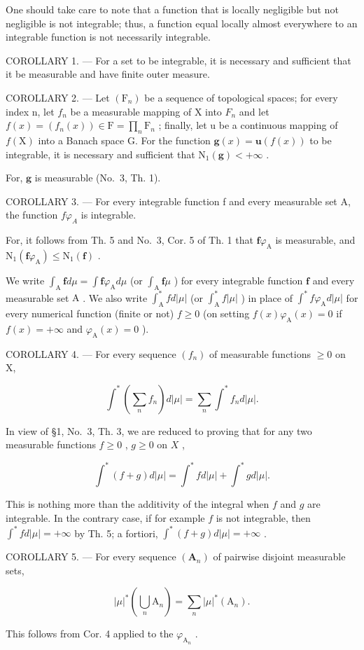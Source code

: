 One should take care to note that a function that is locally negligible but not negligible is not integrable; thus, a function equal locally almost everywhere to an integrable function is not necessarily integrable.

COROLLARY 1. --- For a set to be integrable, it is necessary and sufficient that it be measurable and have finite outer measure.

COROLLARY 2. --- Let \((\mathrm{F}_{n})\) be a sequence of topological spaces; for every index n, let \(f_{n}\) be a measurable mapping of X into \(F_{n}\) and let \(f(x) = (f_{n}(x)) \in \mathrm{F} = \prod_{n} \mathrm{F}_{n}\) ; finally, let u be a continuous mapping of \(f(\mathrm{X})\) into a Banach space G. For the function \(\mathbf{g}(x) = \mathbf{u}(f(x))\) to be integrable, it is necessary and sufficient that \(\mathrm{N}_{1}(\mathbf{g}) < +\infty\) .

For, \(\mathbf{g}\) is measurable (No.~3, Th. 1).

COROLLARY 3. --- For every integrable function f and every measurable set A, the function \(f\varphi_{A}\) is integrable.

For, it follows from Th. 5 and No.~3, Cor. 5 of Th. 1 that \(\mathbf{f}\varphi_{\mathrm{A}}\) is measurable, and \(\mathrm{N}_1(\mathbf{f}\varphi_{\mathrm{A}}) \leqslant \mathrm{N}_1(\mathbf{f})\) .

We write \(\int_{\mathrm{A}} \mathbf{f} d\mu = \int \mathbf{f} \varphi_{\mathrm{A}} d\mu\) (or \(\int_{\mathrm{A}} \mathbf{f} \mu\) ) for every integrable function \(\mathbf{f}\) and every measurable set \(\mathrm{A}\) . We also write \(\int_{\mathrm{A}}^{*} f d|\mu|\) (or \(\int_{\mathrm{A}}^{*} f |\mu|\) ) in place of \(\int^{*} f \varphi_{\mathrm{A}} d|\mu|\) for every numerical function (finite or not) \(f \geqslant 0\) (on setting \(f(x) \varphi_{\mathrm{A}}(x) = 0\) if \(f(x) = +\infty\) and \(\varphi_{\mathrm{A}}(x) = 0\) ).

COROLLARY 4. --- For every sequence \((f_{n})\) of measurable functions \(\geqslant 0\) on X,

\[
\int^ {*} \left(\sum_ {n} f _ {n}\right) d | \mu | = \sum_ {n} \int^ {*} f _ {n} d | \mu |.\tag{1}
\]

In view of §1, No.~3, Th. 3, we are reduced to proving that for any two measurable functions \(f \geqslant 0\) , \(g \geqslant 0\) on \(X\) ,

\[
\int^ {*} (f + g) d | \mu | = \int^ {*} f d | \mu | + \int^ {*} g d | \mu |.\tag{2}
\]

This is nothing more than the additivity of the integral when \(f\) and \(g\) are integrable. In the contrary case, if for example \(f\) is not integrable, then \(\int^{*} f d|\mu| = +\infty\) by Th. 5; a fortiori, \(\int^{*}(f + g) d|\mu| = +\infty\) .

COROLLARY 5. --- For every sequence \((\mathbf{A}_{n})\) of pairwise disjoint measurable sets,

\[
| \mu | ^ {*} \left(\bigcup_ {n} \mathrm{A} _ {n}\right) = \sum_ {n} | \mu | ^ {*} (\mathrm{A} _ {n}).
\]

This follows from Cor. 4 applied to the \(\varphi_{\mathrm{A}_n}\) .
\relax{}
